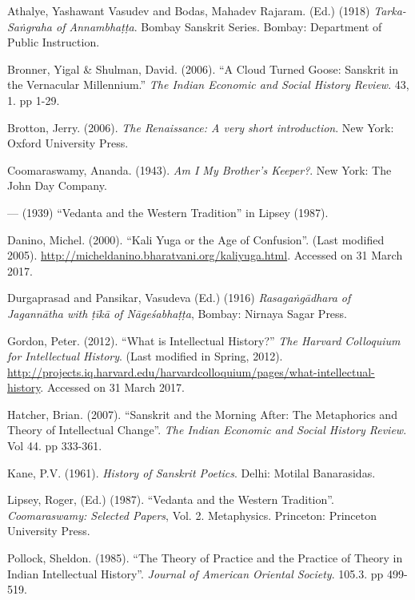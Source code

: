 \begin{thebibliography}{99}
\itemsep=2pt
 Athalye, Yashawant Vasudev and Bodas, Mahadev Rajaram. (Ed.) (1918) {\sl Tarka-Saṅgraha of Annambhaṭṭa}. Bombay Sanskrit Series. Bombay: Department of Public Instruction. 

 Bronner, Yigal \& Shulman, David. (2006). “A Cloud Turned Goose: Sanskrit in the Vernacular Millennium.” {\sl The Indian Economic and Social History Review}. 43, 1. pp 1-29.

Brotton, Jerry. (2006). {\sl The Renaissance: A very short introduction}. New York: Oxford University Press. 

Coomaraswamy, Ananda. (1943). {\sl Am I My Brother’s Keeper?}. New York: The John Day Company. 

--- (1939) ``Vedanta and the Western Tradition'' in Lipsey (1987).

Danino, Michel. (2000). “Kali Yuga or the Age of Confusion”. (Last modified 2005). \url{http://micheldanino.bharatvani.org/kaliyuga.html}. Accessed on 31 March 2017.

Durgaprasad and Pansikar, Vasudeva (Ed.) (1916) {\sl Rasagaṅgādhara of Jagannātha with ṭīkā of Nāgeśabhaṭṭa}, Bombay: Nirnaya Sagar Press. 

Gordon, Peter. (2012). “What is Intellectual History?” {\sl The Harvard Colloquium for Intellectual History}. (Last modified in Spring, 2012). \url{http://projects.iq.harvard.edu/harvardcolloquium/pages/what-intellectual-history}. Accessed on 31 March 2017. 

 Hatcher, Brian. (2007). “Sanskrit and the Morning After: The Metaphorics and Theory of Intellectual Change”. {\sl The Indian Economic and Social History Review}. Vol 44. pp 333-361. 

 Kane, P.V. (1961). {\sl History of Sanskrit Poetics}.  Delhi: Motilal Banarasidas. 

 Lipsey, Roger, (Ed.) (1987). “Vedanta and the Western Tradition”. {\sl Coomaraswamy: Selected Papers}, Vol. 2. Metaphysics. Princeton: Princeton University Press. 

 Pollock, Sheldon. (1985). “The Theory of Practice and the Practice of Theory in Indian Intellectual History”. {\sl Journal of American Oriental Society}. 105.3. pp 499-519. 


\end{thebibliography}
